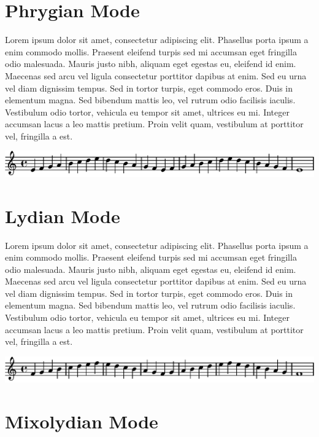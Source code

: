 \documentclass[11pt]{article}
\begin{document}
\section*{Phrygian Mode}
\label{sec-3}

Lorem ipsum dolor sit amet, consectetur adipiscing elit. Phasellus porta ipsum a enim commodo mollis. Praesent eleifend turpis sed mi accumsan eget fringilla odio malesuada. Mauris justo nibh, aliquam eget egestas eu, eleifend id enim. Maecenas sed arcu vel ligula consectetur porttitor dapibus at enim. Sed eu urna vel diam dignissim tempus. Sed in tortor turpis, eget commodo eros. Duis in elementum magna. Sed bibendum mattis leo, vel rutrum odio facilisis iaculis. Vestibulum odio tortor, vehicula eu tempor sit amet, ultrices eu mi. Integer accumsan lacus a leo mattis pretium. Proin velit quam, vestibulum at porttitor vel, fringilla a est.
\linebreak


\includegraphics[width=17cm]{phrygian.eps}
\section*{Lydian Mode}
\label{sec-4}

Lorem ipsum dolor sit amet, consectetur adipiscing elit. Phasellus porta ipsum a enim commodo mollis. Praesent eleifend turpis sed mi accumsan eget fringilla odio malesuada. Mauris justo nibh, aliquam eget egestas eu, eleifend id enim. Maecenas sed arcu vel ligula consectetur porttitor dapibus at enim. Sed eu urna vel diam dignissim tempus. Sed in tortor turpis, eget commodo eros. Duis in elementum magna. Sed bibendum mattis leo, vel rutrum odio facilisis iaculis. Vestibulum odio tortor, vehicula eu tempor sit amet, ultrices eu mi. Integer accumsan lacus a leo mattis pretium. Proin velit quam, vestibulum at porttitor vel, fringilla a est.
\linebreak


\includegraphics[width=17cm]{lydian.eps}
\section*{Mixolydian Mode}
\label{sec-5}
\end{document}
